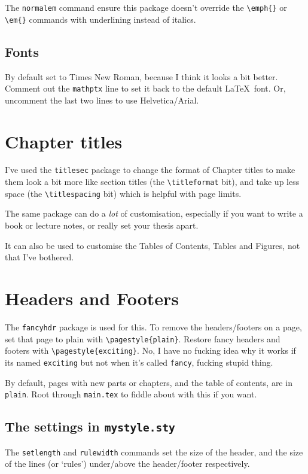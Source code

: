 \documentclass[../main]{subfiles}
\begin{document}
The \texttt{normalem} command ensure this package doesn't override the \verb|\emph{}| or \verb|\em{}| commands with underlining instead of italics.

\subsection{Fonts}
By default set to Times New Roman, because I think it looks a bit better. Comment out the \texttt{mathptx} line to set it back to the default \LaTeX\ font. Or, uncomment the last two lines to use Helvetica/Arial.


\section{Chapter titles}

I've used the \texttt{titlesec} package to change the format of Chapter titles to make them look a bit more like section titles (the \verb|\titleformat| bit), and take up less space (the \verb|\titlespacing| bit) which is helpful with page limits.

The same package can do a \textit{lot} of customisation, especially if you want to write a book or lecture notes, or really set your thesis apart.

It can also be used to customise the Tables of Contents, Tables and Figures, not that I've bothered.

\section{Headers and Footers}

The \texttt{fancyhdr} package is used for this. To remove the headers/footers on a page, set that page to plain with \verb|\pagestyle{plain}|. Restore fancy headers and footers with \verb|\pagestyle{exciting}|. No, I have no fucking idea why it works if its named \texttt{exciting} but not when it's called \texttt{fancy}, fucking stupid thing.

By default, pages with new parts or chapters, and the table of contents, are in \texttt{plain}. Root through \texttt{main.tex} to fiddle about with this if you want.

\subsection{The settings in \texttt{mystyle.sty}}

The \texttt{setlength} and \texttt{rulewidth} commands set the size of the header, and the size of the lines (or `rules') under/above the header/footer respectively.
\end{document}
